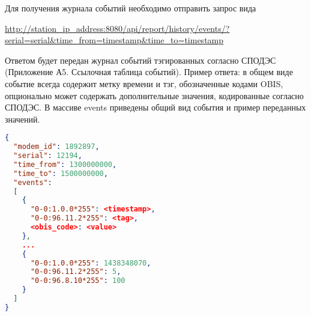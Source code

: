 Для получения журнала событий необходимо отправить запрос вида 
\smallskip

\url{http://station_ip_address:8080/api/report/history/events/?serial=serial&time_from=timestamp&time_to=timestamp} 

\bigskip

Ответом будет передан журнал событий тэгированных согласно СПОДЭС (Приложение А5. Ссылочная таблица событий). Пример ответа: в общем виде событие всегда содержит метку времени и тэг, обозначенные кодами OBIS, опционально может содержать дополнительные значения, кодированные согласно СПОДЭС. В массиве events приведены общий вид события и пример переданных значений.

\bigskip

\begin{lstlisting}[language=json,firstnumber=1]
{
  "modem_id": 1892897,
  "serial": 12194,
  "time_from": 1300000000,
  "time_to": 1500000000,
  "events": 
  [
    {
      "0-0:1.0.0*255": <timestamp>,
      "0-0:96.11.2*255": <tag>,
      <obis_code>: <value>
    },
    ...
    {
      "0-0:1.0.0*255": 1438348070,
      "0-0:96.11.2*255": 5,
      "0-0:96.8.10*255": 100
    }
  ]
}
\end{lstlisting}
